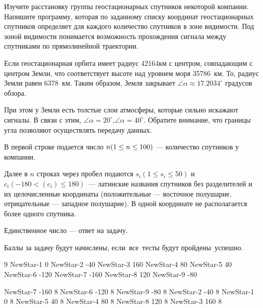 
Изучите расстановку группы геостационарных спутников некоторой компании. Напишите программу, которая по заданному списку координат геостационарных спутников определяет для каждого количество спутников в зоне видимости. Под зоной видимости понимается возможность прохождения сигнала между спутниками по прямолинейной траектории.

Если геостационарная орбита имеет радиус 42164км с центром, совпадающим с центром Земли, что соответствует высоте над уровнем моря 35786~км. То, радиус Земли равен 6378~км. Таким образом, Земля закрывает $\angle \alpha \approx 17.2034^{\circ}$ градусов обзора.


При этом у Земли есть толстые слои атмосферы, которые сильно искажают сигналы. В связи с этим,  $\angle \alpha = 20^{\circ}$,$\angle \alpha = 40^{\circ}$. Обратите внимание, что границы угла позволяют осуществлять передачу данных.


В первой строке подается число $n\space (1\leq n \leq 100)$ — количество спутников у компании.

Далее в $n$ строках через пробел подаются $s_i (1 \leq s_i \leq 50)$ и $c_i (-180 < (c_i) \leq 180)$~— латинские названия спутников без разделителей и их целочисленные координаты (положительные — восточное полушарие, отрицательные — западное полушарие). В одной координате не располагается более одного спутника.

\outputfmtSection

Единственное число — ответ на задачу.

\markSection

Баллы за задачу будут начислены, если все тесты будут пройдены успешно.


\begin{myverbbox}[\small]{\vinput}
    9
    NewStar-1 0
    NewStar-2 -40
    NewStar-3 160
    NewStar-4 80
    NewStar-5 40
    NewStar-6 -120
    NewStar-7 -160
    NewStar-8 120
    NewStar-9 -80
\end{myverbbox}
\begin{myverbbox}[\small]{\voutput}
    NewStar-7 -160 8
    NewStar-6 -120 8
    NewStar-9 -80 8
    NewStar-2 -40 8
    NewStar-1 0 8
    NewStar-5 40 8
    NewStar-4 80 8
    NewStar-8 120 8
    NewStar-3 160 8
\end{myverbbox}

